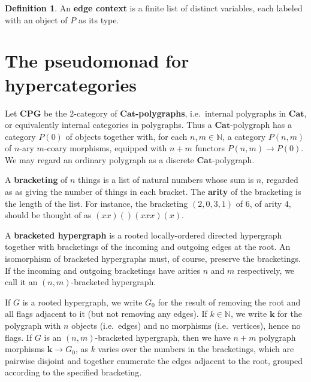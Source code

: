 \documentclass{article}
\theoremstyle{definition}
\newtheorem{defn}[thm]{Definition}
\theoremstyle{remark}
\def\Cat{\ensuremath{\mathbf{Cat}}}
\def\cpg{\ensuremath{\mathbf{CPG}}\xspace}
\def\N{\mathbb{N}}
\begin{document}
\begin{defn}
  An \textbf{edge context} is a finite list of distinct variables, each labeled with an object of $P$ as its type.
\end{defn}


\section{The pseudomonad for hypercategories}
\label{sec:hypercats}

Let \cpg be the 2-category of \textbf{\Cat-polygraphs}, i.e.\ internal polygraphs in \Cat, or equivalently internal categories in polygraphs.
Thus a \Cat-polygraph has a category $P(0)$ of objects together with, for each $n,m\in\N$, a category $P(n,m)$ of $n$-ary $m$-coary morphisms, equipped with $n+m$ functors $P(n,m) \to P(0)$.
We may regard an ordinary polygraph as a discrete \Cat-polygraph.

A \textbf{bracketing} of $n$ things is a list of natural numbers whose sum is $n$, regarded as as giving the number of things in each bracket.
The \textbf{arity} of the bracketing is the length of the list.
For instance, the bracketing $(2,0,3,1)$ of $6$, of arity $4$, should be thought of as $(xx)()(xxx)(x)$.

A \textbf{bracketed hypergraph} is a rooted locally-ordered directed hypergraph together with bracketings of the incoming and outgoing edges at the root.
An isomorphism of bracketed hypergraphs must, of course, preserve the bracketings.
If the incoming and outgoing bracketings have arities $n$ and $m$ respectively, we call it an $(n,m)$-bracketed hypergraph.

If $G$ is a rooted hypergraph, we write $G_0$ for the result of removing the root and all flags adjacent to it (but not removing any edges).
If $k\in\N$, we write $\mathbf{k}$ for the polygraph with $n$ objects (i.e.\ edges) and no morphisms (i.e.\ vertices), hence no flags.
If $G$ is an $(n,m)$-bracketed hypergraph, then we have $n+m$ polygraph morphisms $\mathbf{k}\to G_0$, as $k$ varies over the numbers in the bracketings, which are pairwise disjoint and together enumerate the edges adjacent to the root, grouped according to the specified bracketing.
\end{document}
